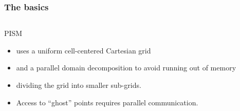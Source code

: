 \documentclass[hide notes,intlimits]{beamer}
\begin{document}
\begin{frame}
  \frametitle{The basics}

  \begin{columns}
    \begin{column}{0.5\linewidth}
      PISM
      \begin{itemize}
      \item<1-> uses a uniform cell-centered Cartesian grid
      \item<2-> and a parallel domain decomposition to avoid running out
        of memory
      \item<3-> dividing the grid into smaller sub-grids.
      \item<4> Access to ``ghost'' points requires parallel communication.
      \end{itemize}
    \end{column}


\end{columns}
\end{frame}
\end{document}
